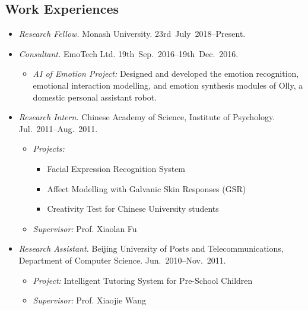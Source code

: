 \documentclass[11pt,letterpaper]{article}
\begin{document}
\subsection*{Work Experiences}
\begin{itemize}
  \item \emph{Research Fellow.} Monash University. 23rd~July~2018--Present.
  \item \emph{Consultant.} EmoTech Ltd. 19th~Sep.~2016--19th~Dec.~2016.
  \begin{itemize}
    \item \emph{AI of Emotion Project:} Designed and developed the emotion recognition, emotional interaction modelling, and emotion synthesis modules of Olly, a domestic personal assistant robot. 
  \end{itemize}
  \item \emph{Research Intern.} Chinese Academy of Science, Institute of Psychology. Jul.~2011--Aug.~2011.
  \begin{itemize}
    \item \emph{Projects:} 
      \begin{itemize}
      \item Facial Expression Recognition System %
      \item Affect Modelling with Galvanic Skin Responses (GSR) %
      \item Creativity Test for Chinese University students %
      \end{itemize}
    \item \emph{Supervisor:} Prof. Xiaolan Fu
  \end{itemize}
  \item \emph{Research Assistant.} Beijing University of Posts and Telecommunications, Department of Computer Science. Jun.~2010--Nov.~2011.
  \begin{itemize}
    \item \emph{Project:} Intelligent Tutoring System for Pre-School Children
    \item \emph{Supervisor:} Prof. Xiaojie Wang
  \end{itemize}
\end{itemize}
\end{document}
